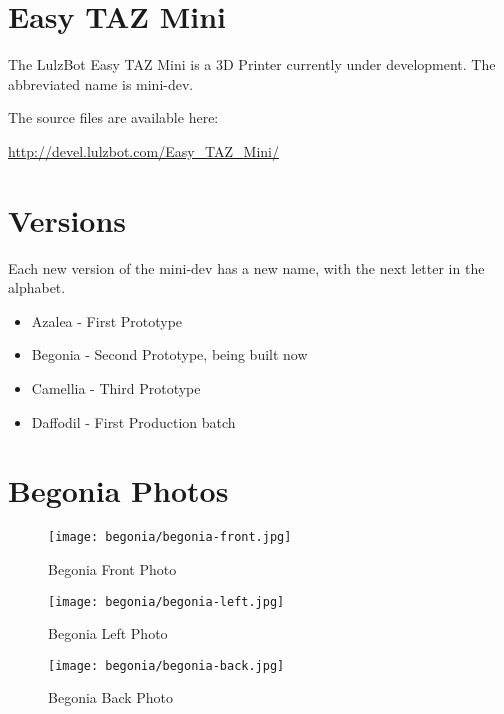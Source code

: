 %
%
%
%
%

\section{Easy TAZ Mini}
The LulzBot Easy TAZ Mini is a 3D Printer currently under development. The
abbreviated name is mini-dev.

The source files are available here:

\href{http://devel.lulzbot.com/Easy\_TAZ\_Mini/}{http://devel.lulzbot.com/Easy\_TAZ\_Mini/}

\section{Versions}
Each new version of the mini-dev has a new name, with the next letter in the alphabet.

\begin{itemize}
  \item Azalea - First Prototype
  \item Begonia - Second Prototype, being built now
  \item Camellia - Third Prototype
  \item Daffodil - First Production batch
\end{itemize}

\section{Begonia Photos}

\begin{figure}[H]
\centering
\texttt{[image: begonia/begonia-front.jpg]}
\caption{Begonia Front Photo}
\label{fig:begfrontfoto}
\end{figure}

\begin{figure}[H]
\centering
\texttt{[image: begonia/begonia-left.jpg]}
\caption{Begonia Left Photo}
\label{fig:begleftfoto}
\end{figure}

\begin{figure}[H]
\centering
\texttt{[image: begonia/begonia-back.jpg]}
\caption{Begonia Back Photo}
\label{fig:begbackfoto}
\end{figure}

